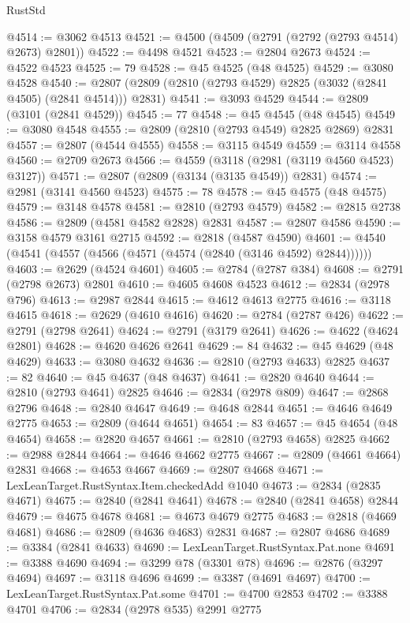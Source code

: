 \begin{lexlean}{RustStd}
\begin{coremodule}
@4514 := @3062 @4513
@4521 := @4500 (@4509 (@2791 (@2792 (@2793 @4514) @2673) @2801))
@4522 := @4498 @4521
@4523 := @2804 @2673
@4524 := @4522 @4523
@4525 := 79
@4528 := @45 @4525 (@48 @4525)
@4529 := @3080 @4528
@4540 := @2807 (@2809 (@2810 (@2793 @4529) @2825 (@3032 (@2841 @4505) (@2841 @4514))) @2831)
@4541 := @3093 @4529
@4544 := @2809 (@3101 (@2841 @4529))
@4545 := 77
@4548 := @45 @4545 (@48 @4545)
@4549 := @3080 @4548
@4555 := @2809 (@2810 (@2793 @4549) @2825 @2869) @2831
@4557 := @2807 (@4544 @4555)
@4558 := @3115 @4549
@4559 := @3114 @4558
@4560 := @2709 @2673
@4566 := @4559 (@3118 (@2981 (@3119 @4560 @4523) @3127))
@4571 := @2807 (@2809 (@3134 (@3135 @4549)) @2831)
@4574 := @2981 (@3141 @4560 @4523)
@4575 := 78
@4578 := @45 @4575 (@48 @4575)
@4579 := @3148 @4578
@4581 := @2810 (@2793 @4579)
@4582 := @2815 @2738
@4586 := @2809 (@4581 @4582 @2828) @2831
@4587 := @2807 @4586
@4590 := @3158 @4579 @3161 @2715
@4592 := @2818 (@4587 @4590)
@4601 := @4540 (@4541 (@4557 (@4566 (@4571 (@4574 (@2840 (@3146 @4592) @2844))))))
@4603 := @2629 (@4524 @4601)
@4605 := @2784 (@2787 @384)
@4608 := @2791 (@2798 @2673) @2801
@4610 := @4605 @4608 @4523
@4612 := @2834 (@2978 @796)
@4613 := @2987 @2844
@4615 := @4612 @4613 @2775
@4616 := @3118 @4615
@4618 := @2629 (@4610 @4616)
@4620 := @2784 (@2787 @426)
@4622 := @2791 (@2798 @2641)
@4624 := @2791 (@3179 @2641)
@4626 := @4622 (@4624 @2801)
@4628 := @4620 @4626 @2641
@4629 := 84
@4632 := @45 @4629 (@48 @4629)
@4633 := @3080 @4632
@4636 := @2810 (@2793 @4633) @2825
@4637 := 82
@4640 := @45 @4637 (@48 @4637)
@4641 := @2820 @4640
@4644 := @2810 (@2793 @4641) @2825
@4646 := @2834 (@2978 @809)
@4647 := @2868 @2796
@4648 := @2840 @4647
@4649 := @4648 @2844
@4651 := @4646 @4649 @2775
@4653 := @2809 (@4644 @4651)
@4654 := 83
@4657 := @45 @4654 (@48 @4654)
@4658 := @2820 @4657
@4661 := @2810 (@2793 @4658) @2825
@4662 := @2988 @2844
@4664 := @4646 @4662 @2775
@4667 := @2809 (@4661 @4664) @2831
@4668 := @4653 @4667
@4669 := @2807 @4668
@4671 := LexLeanTarget.RustSyntax.Item.checkedAdd @1040
@4673 := @2834 (@2835 @4671)
@4675 := @2840 (@2841 @4641)
@4678 := @2840 (@2841 @4658) @2844
@4679 := @4675 @4678
@4681 := @4673 @4679 @2775
@4683 := @2818 (@4669 @4681)
@4686 := @2809 (@4636 @4683) @2831
@4687 := @2807 @4686
@4689 := @3384 (@2841 @4633)
@4690 := LexLeanTarget.RustSyntax.Pat.none
@4691 := @3388 @4690
@4694 := @3299 @78 (@3301 @78)
@4696 := @2876 (@3297 @4694)
@4697 := @3118 @4696
@4699 := @3387 (@4691 @4697)
@4700 := LexLeanTarget.RustSyntax.Pat.some
@4701 := @4700 @2853
@4702 := @3388 @4701
@4706 := @2834 (@2978 @535) @2991 @2775

\end{coremodule}
\end{lexlean}
